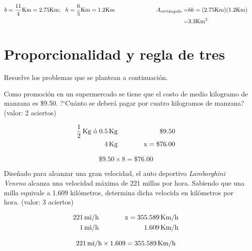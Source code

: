 \documentclass[11pt]{article}
\begin{document}
\begin{align*}
    b=\frac{11}{4}\text{Km} = 2.75\text{Km}; \ \ 
    h=\frac{6}{5}\text{Km}=1.2\text{Km} \text{\hspace{2.5cm}}  
    A_{\text{rect\'angulo}} =& bh = (2.75\text{Km})(1.2\text{Km})  \\
    =& 3.3\text{Km}^{2}
\end{align*}

\vspace{2cm}

\section{Proporcionalidad y regla de tres}

Resuelve los problemas que se plantean a continuaci\'on.

\vspace{0.5cm}

Como promoci\'on en un supermercado se tiene que el costo de medio kilogramo de
manzana es \$9.50. ?`Cu\'anto se deber\'a pagar por cuatro kilogramos de
manzana? (valor: 2 aciertos)

\begin{minipage}[h!]{0.3\textwidth}
    \begin{eqnarray*}
        \frac{1}{2}\text{\,Kg  \'o 0.5\,Kg} &\hspace{1cm}& \$9.50\\
        4\text{\,Kg} &\hspace{1cm}& \text{x}=\$76.00
    \end{eqnarray*}
\end{minipage}\hspace{5cm}
\begin{minipage}[h!]{0.3\textwidth}
    \begin{equation*}
        \$9.50 \times 8 = \$76.00
    \end{equation*}
\end{minipage}

\vspace{3cm}

Dise\~nado para alcanzar una gran velocidad,  el auto deportivo
\textit{Lamborghini Veneno} alcanza una velocidad m\'axima de 221 millas por
hora. Sabiendo que una milla equivale a 1.609 kil\'ometros, determina dicha
velocida en kil\'ometros por hora. (valor: 3 aciertos)

\begin{minipage}[h!]{0.3\textwidth}
    \begin{eqnarray*}
        221\text{\,mi/h} &\hspace{1cm}& \text{x}= 355.589\text{\,Km/h} \\
        1\text{\,mi/h} &\hspace{1cm}& 1.609\text{\,Km/h} 
    \end{eqnarray*}
\end{minipage}\hspace{5cm}
\begin{minipage}[h!]{0.3\textwidth}
    \begin{equation*}
        221\text{\,mi/h} \times 1.609 = 355.589\text{\,Km/h}
    \end{equation*}
\end{minipage}
\end{document}
